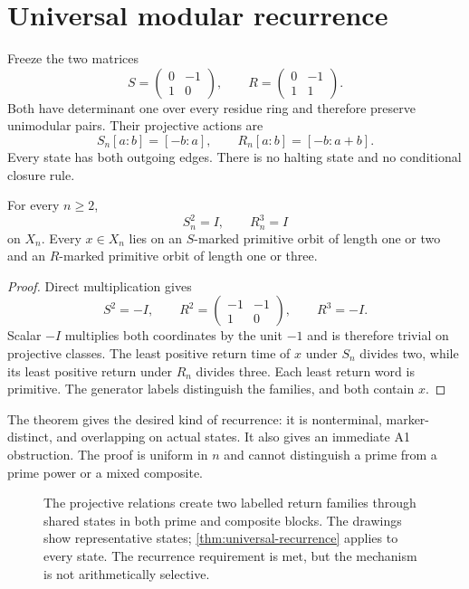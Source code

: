 \section{Universal modular recurrence}
\label{sec:modular-cycles}

Freeze the two matrices
\[
 S=\begin{pmatrix}0&-1\\1&0\end{pmatrix},\qquad
 R=\begin{pmatrix}0&-1\\1&1\end{pmatrix}.
\]
Both have determinant one over every residue ring and therefore preserve
unimodular pairs.  Their projective actions are
\[
 S_n[a:b]=[-b:a],\qquad
 R_n[a:b]=[-b:a+b].
\]
Every state has both outgoing edges.  There is no halting state and no
conditional closure rule.

\begin{theorem}
\label{thm:universal-recurrence}
For every $n\ge2$,
\[
 S_n^2=I,\qquad R_n^3=I
\]
on $X_n$.  Every $x\in X_n$ lies on an $S$-marked primitive orbit of length
one or two and an $R$-marked primitive orbit of length one or three.
\end{theorem}

\begin{proof}
Direct multiplication gives
\[
 S^2=-I,\qquad
 R^2=\begin{pmatrix}-1&-1\\1&0\end{pmatrix},\qquad
 R^3=-I.
\]
Scalar $-I$ multiplies both coordinates by the unit $-1$ and is therefore
trivial on projective classes.  The least positive return time of $x$ under
$S_n$ divides two, while its least positive return under $R_n$ divides three.
Each least return word is primitive.  The generator labels distinguish the
families, and both contain $x$.
\end{proof}

The theorem gives the desired kind of recurrence: it is nonterminal,
marker-distinct, and overlapping on actual states.  It also gives an
immediate A1 obstruction.  The proof is uniform in $n$ and cannot distinguish
a prime from a prime power or a mixed composite.

\begin{figure}[t]
\centering
\resizebox{0.96\textwidth}{!}{}
\caption{The projective relations create two labelled return families through
shared states in both prime and composite blocks.  The drawings show
representative states; \cref{thm:universal-recurrence} applies to every state.
The recurrence requirement is met, but the mechanism is not arithmetically
selective.}
\label{fig:projective-recurrence}
\end{figure}

